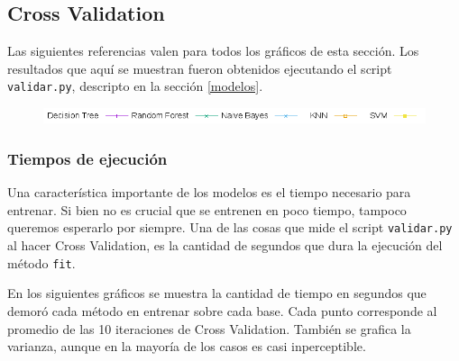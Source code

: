 \documentclass[10pt, a4paper]{article}
\begin{document}
\subsection{Cross Validation}

Las siguientes referencias valen para todos los gráficos de esta sección. Los resultados que aquí se muestran fueron obtenidos ejecutando el script \texttt{validar.py}, descripto en la sección \ref{modelos}.

\begin{figure}[H]
\includegraphics[scale=0.6]{../src/data/refs.png}
\end{figure}

\subsubsection{Tiempos de ejecución}

Una característica importante de los modelos es el tiempo necesario para entrenar. Si bien no es crucial que se entrenen en poco tiempo, tampoco queremos esperarlo por siempre. Una de las cosas que mide el script \texttt{validar.py} al hacer Cross Validation, es la cantidad de segundos que dura la ejecución del método \texttt{fit}.

En los siguientes gráficos se muestra la cantidad de tiempo en segundos que demoró cada método en entrenar sobre cada base. Cada punto corresponde al promedio de las 10 iteraciones de Cross Validation. También se grafica la varianza, aunque en la mayoría de los casos es casi inperceptible.
\end{document}
